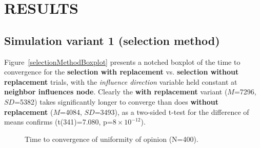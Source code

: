 
\section{RESULTS}

\subsection{Simulation variant 1 (selection method)}

Figure~\ref{selectionMethodBoxplot} presents a notched boxplot of the time to
convergence for the \textbf{selection with replacement} vs. \textbf{selection
without replacement} trials, with the \textsl{influence direction} variable
held constant at \textbf{neighbor influences node}. Clearly the \textbf{with
replacement} variant ($M$=7296, $SD$=5382) takes significantly longer to
converge than does \textbf{without replacement} ($M$=4084, $SD$=3493), as a
two-sided t-test for the difference of means confirms (t(341)=7.080,
p=$8\times 10^{-12}$).

\begin{figure}[!tbp]
  \centering
  \hfill
  \caption{Time to convergence of uniformity of opinion (N=400).}
\end{figure}


